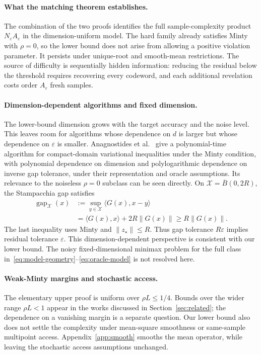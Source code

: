 \documentclass[11pt,a4paper]{article}
\newcommand{\eps}{\varepsilon}
\DeclareMathOperator{\gap}{gap}
\theoremstyle{definition}
\theoremstyle{remark}
\begin{document}
\paragraph{What the matching theorem establishes.}
The combination of the two proofs identifies the full sample-complexity
product $N_\eps A_\eps$ in the dimension-uniform model. The hard family
already satisfies Minty with $\rho=0$, so the lower bound does not arise
from allowing a positive violation parameter. It persists under unique-root
and smooth-mean restrictions. The source of difficulty is sequentially
hidden information: reducing the residual below the threshold requires
recovering every codeword, and each additional revelation costs order
$A_\eps$ fresh samples.

\paragraph{Dimension-dependent algorithms and fixed dimension.}
The lower-bound dimension grows with the target accuracy and the noise
level. This leaves room for algorithms whose dependence on $d$ is larger
but whose dependence on $\eps$ is smaller. Anagnostides et al.~\cite{afsz2026}
give a polynomial-time algorithm for compact-domain variational inequalities
under the Minty condition, with polynomial dependence on dimension and
polylogarithmic dependence on inverse gap tolerance, under their representation
and oracle assumptions. Its relevance to the noiseless $\rho=0$ subclass
can be seen directly. On $\mathcal X=\overline B(0,2R)$, the Stampacchia gap
satisfies
\begin{align}\label{eq:gap-conversion}
 \gap_{\mathcal X}(x)
 &:=\sup_{y\in\mathcal X}\langle G(x),x-y\rangle\nonumber\\
 &=\langle G(x),x\rangle+2R\|G(x)\|
 \ge R\|G(x)\|.
\end{align}
The last inequality uses Minty and $\|z_\star\|\le R$.
Thus gap tolerance $R\eps$ implies residual tolerance $\eps$.
This dimension-dependent perspective is consistent with our lower bound.
The noisy fixed-dimensional minimax problem for the full class
in~\eqref{eq:model-geometry}--\eqref{eq:oracle-model} is not resolved here.

\paragraph{Weak-Minty margins and stochastic access.}
The elementary upper proof is uniform over $\rho L\le1/4$.
Bounds over the wider range $\rho L<1$ appear in the works discussed in
Section~\ref{sec:related}; the dependence on a vanishing margin is a separate
question. Our lower bound also does not settle the complexity under
mean-square smoothness or same-sample multipoint access. Appendix~\ref{app:smooth}
smooths the mean operator, while leaving the stochastic access assumptions
unchanged.
\end{document}
